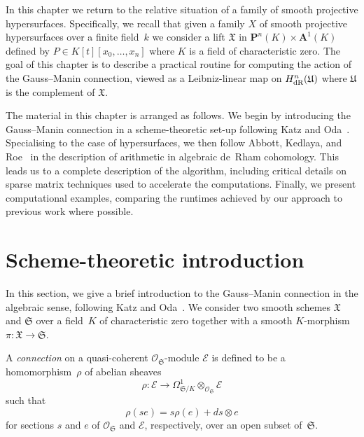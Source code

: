 
In this chapter we return to the relative situation of a family of 
smooth projective hypersurfaces.  Specifically, we recall that given 
a family $X$ of smooth projective hypersurfaces over a finite field~$k$ 
we consider a lift $\mathfrak{X}$ in $\mathbf{P}^n(K) \times \mathbf{A}^1(K)$ 
defined by $P \in K[t][x_0, \dotsc, x_n]$ where $K$ is a field of 
characteristic zero.  The goal of this chapter is to 
describe a practical routine for computing the action of the Gauss--Manin 
connection, viewed as a Leibniz-linear map on $H_{\text{dR}}^n(\mathfrak{U})$ where 
$\mathfrak{U}$ is the complement of $\mathfrak{X}$.

The material in this chapter is arranged as follows.  We begin by introducing 
the Gauss--Manin connection in a scheme-theoretic set-up following Katz and 
Oda~\citep{KatzOda1968}.  Specialising to the case of hypersurfaces, we 
then follow Abbott, Kedlaya, and Roe~\citep{AbbottKedlayaRoe2006} in the 
description of arithmetic in algebraic de~Rham cohomology.  This leads us 
to a complete description of the algorithm, including critical details on 
sparse matrix techniques used to accelerate the computations.  Finally, we 
present computational examples, comparing the runtimes achieved by our approach 
to previous work where possible.


\section{Scheme-theoretic introduction}

In this section, we give a brief introduction to the Gauss--Manin connection 
in the algebraic sense, following Katz and Oda~\citep{KatzOda1968}.  
We consider two smooth schemes $\mathfrak{X}$ and $\mathfrak{S}$ over a 
field~$K$ of characteristic zero together with a smooth $K$-morphism 
$\pi \colon \mathfrak{X} \to \mathfrak{S}$.

\begin{defn}
A \emph{connection} on a quasi-coherent $\mathcal{O}_{\mathfrak{S}}$-module 
$\mathcal{E}$ is defined to be a homomorphism~$\rho$ of abelian sheaves
\begin{equation*}
\rho \colon \mathcal{E} \to 
    \Omega_{\mathfrak{S}/K}^1 \otimes_{\mathcal{O}_{\mathfrak{S}}} \mathcal{E}
\end{equation*}
such that
\begin{equation*}
\rho(s e) = s \rho(e) + ds \otimes e
\end{equation*}
for sections $s$ and $e$ of $\mathcal{O}_{\mathfrak{S}}$ and $\mathcal{E}$, 
respectively, over an open subset of~$\mathfrak{S}$.
\end{defn}

